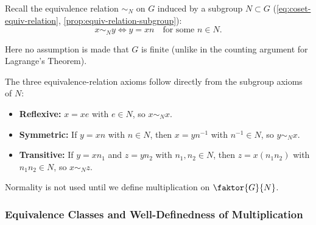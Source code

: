 \begin{proofWrapper}
\begin{content}
Recall the equivalence relation $\sim_N$ on $G$ induced by a subgroup $N \subset G$ (\cref{eq:coset-equiv-relation}, \cref{prop:equiv-relation-subgroup}):
\[
x \sim_N y \iff y = x n \quad \text{for some } n \in N.
\]
Here no assumption is made that $G$ is finite (unlike in the counting argument for Lagrange's Theorem).

\begin{steps}
The three equivalence-relation axioms follow directly from the subgroup axioms of $N$:
\begin{itemize}
    \item \textbf{Reflexive:} $x = x e$ with $e \in N$, so $x \sim_N x$.
    \item \textbf{Symmetric:} If $y = x n$ with $n \in N$, then $x = y n^{-1}$ with $n^{-1} \in N$, so $y \sim_N x$.
    \item \textbf{Transitive:} If $y = x n_1$ and $z = y n_2$ with $n_1, n_2 \in N$, then $z = x (n_1 n_2)$ with $n_1 n_2 \in N$, so $x \sim_N z$.
\end{itemize}
Normality is not used until we define multiplication on $\faktor{G}{N}$.
\end{steps}
\end{content}

\begin{hidden}
\end{hidden}

\subsubsection{Equivalence Classes and Well-Definedness of Multiplication}


\end{proofWrapper}
